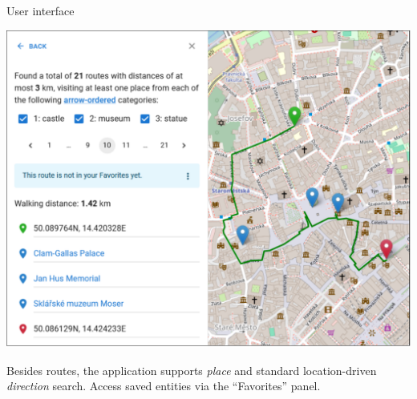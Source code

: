 \documentclass[portrait,a0paper,fontscale=0.25]{baposter}
\begin{document}
\begin{poster}
\begin{posterbox}[column=1, name=ui]{User interface}
\begin{minipage}{1.00\textwidth}
\begin{minipage}{0.49\textwidth}
\vspace{0.35em}
\includegraphics[width=1.00\linewidth]{./img/poster/uc04-search-routes-result.pdf}
\end{minipage}
\end{minipage}

\vspace{0.5em}

Besides routes, the application supports \emph{place} and standard location-driven \emph{direction} search. Access saved entities via the ``Favorites'' panel.

\vspace{0.5em}


\end{posterbox}
\end{poster}
\end{document}
